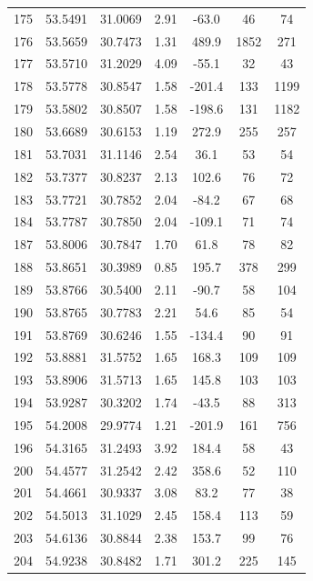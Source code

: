 \begin{longtable}{ccccccc}
175 & 53.5491 & 31.0069 & 2.91 & -63.0 & 46 & 74 \\
176 & 53.5659 & 30.7473 & 1.31 & 489.9 & 1852 & 271 \\
177 & 53.5710 & 31.2029 & 4.09 & -55.1 & 32 & 43 \\
178 & 53.5778 & 30.8547 & 1.58 & -201.4 & 133 & 1199 \\
179 & 53.5802 & 30.8507 & 1.58 & -198.6 & 131 & 1182 \\
180 & 53.6689 & 30.6153 & 1.19 & 272.9 & 255 & 257 \\
181 & 53.7031 & 31.1146 & 2.54 & 36.1 & 53 & 54 \\
182 & 53.7377 & 30.8237 & 2.13 & 102.6 & 76 & 72 \\
183 & 53.7721 & 30.7852 & 2.04 & -84.2 & 67 & 68 \\
184 & 53.7787 & 30.7850 & 2.04 & -109.1 & 71 & 74 \\
187 & 53.8006 & 30.7847 & 1.70 & 61.8 & 78 & 82 \\
188 & 53.8651 & 30.3989 & 0.85 & 195.7 & 378 & 299 \\
189 & 53.8766 & 30.5400 & 2.11 & -90.7 & 58 & 104 \\
190 & 53.8765 & 30.7783 & 2.21 & 54.6 & 85 & 54 \\
191 & 53.8769 & 30.6246 & 1.55 & -134.4 & 90 & 91 \\
192 & 53.8881 & 31.5752 & 1.65 & 168.3 & 109 & 109 \\
193 & 53.8906 & 31.5713 & 1.65 & 145.8 & 103 & 103 \\
194 & 53.9287 & 30.3202 & 1.74 & -43.5 & 88 & 313 \\
195 & 54.2008 & 29.9774 & 1.21 & -201.9 & 161 & 756 \\
196 & 54.3165 & 31.2493 & 3.92 & 184.4 & 58 & 43 \\
200 & 54.4577 & 31.2542 & 2.42 & 358.6 & 52 & 110 \\
201 & 54.4661 & 30.9337 & 3.08 & 83.2 & 77 & 38 \\
202 & 54.5013 & 31.1029 & 2.45 & 158.4 & 113 & 59 \\
203 & 54.6136 & 30.8844 & 2.38 & 153.7 & 99 & 76 \\
204 & 54.9238 & 30.8482 & 1.71 & 301.2 & 225 & 145 \\
\end{longtable}